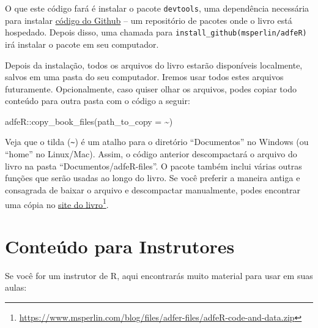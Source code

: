 \documentclass[
  11pt,
]{book}
\newenvironment{Shaded}{\begin{snugshade}}{\end{snugshade}}
\newcommand{\AttributeTok}[1]{\textcolor[rgb]{0.61,0.61,0.61}{#1}}
\newcommand{\FunctionTok}[1]{\textcolor[rgb]{0,0,0}{#1}}
\newcommand{\NormalTok}[1]{#1}
\newcommand{\SpecialCharTok}[1]{\textcolor[rgb]{0,0,0}{#1}}
\newcommand{\StringTok}[1]{\textcolor[rgb]{0.5,0.5,0.5}{#1}}
\begin{document}
O que este código fará é instalar o pacote \texttt{devtools}, uma dependência necessária para instalar \href{https://github.com/msperlin/adfeR}{código do Github} -- um repositório de pacotes onde o livro está hospedado. Depois disso, uma chamada para \texttt{install\_github(\textquotesingle{}msperlin/adfeR\textquotesingle{})} irá instalar o pacote em seu computador.

Depois da instalação, todos os arquivos do livro estarão disponíveis localmente, salvos em uma pasta do seu computador. Iremos usar todos estes arquivos futuramente. Opcionalmente, caso quiser olhar os arquivos, podes copiar todo conteúdo para outra pasta com o código a seguir:

\begin{Shaded}
\begin{Highlighting}[]
\NormalTok{adfeR}\SpecialCharTok{::}\FunctionTok{copy\_book\_files}\NormalTok{(}\AttributeTok{path\_to\_copy =} \StringTok{\textquotesingle{}\textasciitilde{}\textquotesingle{}}\NormalTok{)}
\end{Highlighting}
\end{Shaded}

Veja que o tilda (\texttt{\textasciitilde{}}) é um atalho para o diretório ``Documentos'' no Windows (ou ``home'' no Linux/Mac). Assim, o código anterior descompactará o arquivo do livro na pasta ``Documentos/adfeR-files''. O pacote também inclui várias outras funções que serão usadas ao longo do livro. Se você preferir a maneira antiga e consagrada de baixar o arquivo e descompactar manualmente, podes encontrar uma cópia no \href{https://www.msperlin.com/blog/files/adfer-files/adfeR-code-and-data.zip}{site do livro}\footnote{\url{https://www.msperlin.com/blog/files/adfer-files/adfeR-code-and-data.zip}}.

\hypertarget{conteuxfado-para-instrutores}{%
\section*{Conteúdo para Instrutores}\label{conteuxfado-para-instrutores}}

Se você for um instrutor de R, aqui encontrarás muito material para usar em suas aulas:
\end{document}
